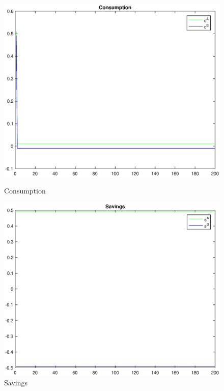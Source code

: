 \documentclass[12pt]{article}
\begin{document}
\begin{figure}[h]
    \centering
    \begin{minipage}{0.5\textwidth}
        \includegraphics[width=1\textwidth]{IRF_c.eps}
        \caption{Consumption}
    \end{minipage}\hfill
    \begin{minipage}{0.5\textwidth}
        \includegraphics[width=1\textwidth]{IRF_s.eps}
        \caption{Savings}
    \end{minipage}
\end{figure}
\end{document}
